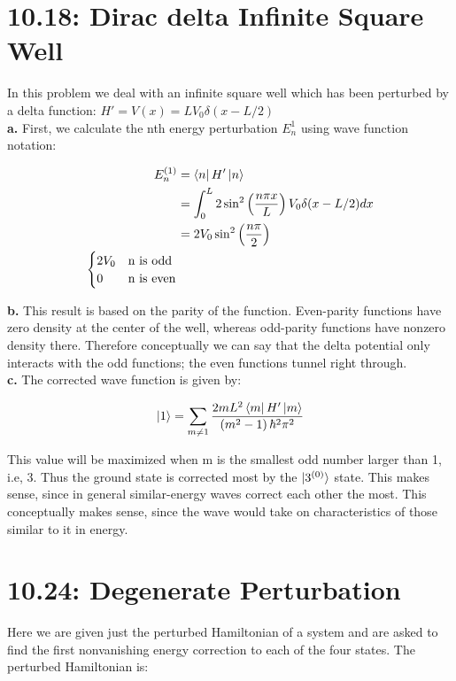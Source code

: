 \documentclass[10pt]{article} %
\begin{document}
\section{10.18: Dirac delta Infinite Square Well}
In this problem we deal with an infinite square well which has been perturbed by a delta function:
$H' = V(x) = LV_0\delta(x-L/2)$\\

\textbf{a.} First, we calculate the nth energy perturbation $E_n^1$ using wave function notation:

\begin{align*}
  E_n^{(1)} &= \bra{n}H'\ket{n}\\
  &= \int_0^L 2\sin^2\left(\frac{n\pi x}{L}\right)V_0\delta(x-L/2)dx\\
  &= 2V_0\sin^2\left(\frac{n\pi}{2}\right)\\
  \begin{cases}
    2V_0 & \mbox{n is odd}\\
    0 & \mbox{n is even}\\
  \end{cases}\\
\end{align*}

\textbf{b.}
This result is based on the parity of the function. Even-parity functions have zero density at the
center of the well, whereas odd-parity functions have nonzero density there. Therefore conceptually
we can say that the delta potential only interacts with the odd functions; the even functions tunnel
right through.\\

\textbf{c.}
The corrected wave function is given by:

\begin{align*}
  \ket{1} = \sum_{m\neq1} \frac{2mL^2\bra{m}H'\ket{m}}{\left(m^2-1\right)\hbar^2\pi^2}\\
\end{align*}

This value will be maximized when m is the smallest odd number larger than 1, i.e, 3. Thus the
ground state is corrected most by the $\ket{3^{(0)}}$ state. This makes sense, since in general
similar-energy waves correct each other the most. This conceptually makes sense, since the wave
would take on characteristics of those similar to it in energy.\\

\section{10.24: Degenerate Perturbation}
Here we are given just the perturbed Hamiltonian of a system and are asked to find the first
nonvanishing energy correction to each of the four states. The perturbed Hamiltonian is:
\end{document}

